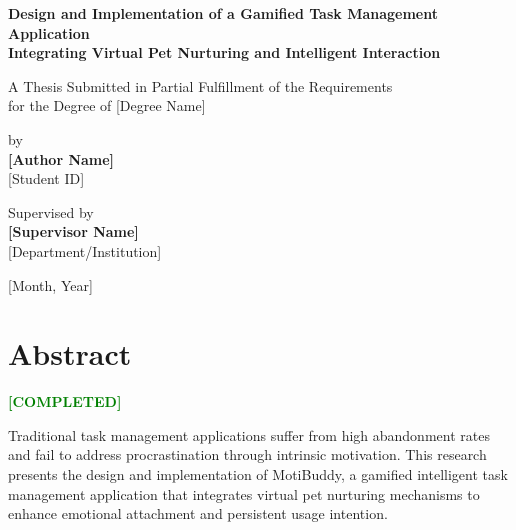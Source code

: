 \documentclass[12pt,a4paper]{report}
\newcommand{\completed}{\textcolor{green}{\textbf{[COMPLETED]}}}
\begin{document}
\begin{titlepage}
    \centering
    \vspace*{2cm}
    
    {\LARGE\bfseries Design and Implementation of a Gamified Task Management Application\\[0.3cm]
    Integrating Virtual Pet Nurturing and Intelligent Interaction\par}
    
    \vspace{2cm}
    
    {\Large A Thesis Submitted in Partial Fulfillment of the Requirements\\[0.3cm]
    for the Degree of [Degree Name]\par}
    
    \vspace{2cm}
    
    {\large by\\[0.5cm]
    \textbf{[Author Name]}\\[0.3cm]
    [Student ID]\par}
    
    \vspace{2cm}
    
    {\large Supervised by\\[0.3cm]
    \textbf{[Supervisor Name]}\\[0.3cm]
    [Department/Institution]\par}
    
    \vfill
    
    {\large [Month, Year]\par}
    
\end{titlepage}

\chapter*{Abstract}

\completed

Traditional task management applications suffer from high abandonment rates and fail to address procrastination through intrinsic motivation. This research presents the design and implementation of MotiBuddy, a gamified intelligent task management application that integrates virtual pet nurturing mechanisms to enhance emotional attachment and persistent usage intention.
\end{document}

